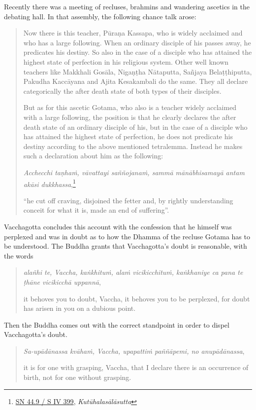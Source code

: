 Recently there was a meeting of recluses, brahmins and wandering ascetics in the debating hall. In that assembly, the following chance talk arose:

\begin{quote}
Now there is this teacher, Pūraṇa Kassapa, who is widely acclaimed and who has a large following. When an ordinary disciple of his passes away, he predicates his destiny. So also in the case of a disciple who has attained the highest state of perfection in his religious system. Other well known teachers like Makkhali Gosāla, Nigaṇṭha Nātaputta, Sañjaya Belaṭṭhiputta, Pakudha Kaccāyana and Ajita Kesakambali do the same. They all declare categorically the after death state of both types of their disciples.

But as for this ascetic Gotama, who also is a teacher widely acclaimed with a large following, the position is that he clearly declares the after death state of an ordinary disciple of his, but in the case of a disciple who has attained the highest state of perfection, he does not predicate his destiny according to the above mentioned tetralemma. Instead he makes such a declaration about him as the following:

\emph{Acchecchi taṇhaṁ, vāvattayi saññojanaṁ, sammā mānābhisamayā antam akāsi dukkhassa},\footnote{\href{https://suttacentral.net/sn44.9/pli/ms}{SN 44.9 / S IV 399}, \emph{Kutūhalasālāsutta}}

``he cut off craving, disjoined the fetter and, by rightly understanding conceit for what it is, made an end of suffering''.
\end{quote}

Vacchagotta concludes this account with the confession that he himself was perplexed and was in doubt as to how the Dhamma of the recluse Gotama has to be understood. The Buddha grants that Vacchagotta's doubt is reasonable, with the words

\begin{quote}
\emph{alañhi te, Vaccha, kaṅkhituṁ, alaṁ vicikicchituṁ, kaṅkhaniye ca pana te ṭhāne vicikicchā uppannā},

it behoves you to doubt, Vaccha, it behoves you to be perplexed, for doubt has arisen in you on a dubious point.
\end{quote}

Then the Buddha comes out with the correct standpoint in order to dispel Vacchagotta's doubt.

\begin{quote}
\emph{Sa-upādānassa kvāhaṁ, Vaccha, upapattiṁ paññāpemi, no anupādānassa},

it is for one with grasping, Vaccha, that I declare there is an occurrence of birth, not for one without grasping.
\end{quote}

